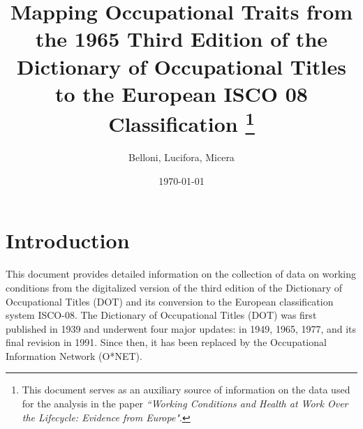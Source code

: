 \documentclass[11pt, a4paper, leqno]{article}
\title{Mapping Occupational Traits from the 1965 Third Edition of the Dictionary of Occupational Titles to the European ISCO 08 Classification \thanks{This document serves as an auxiliary source of information on the data used for the analysis in the paper \textit{``Working Conditions and Health at Work Over the Lifecycle: Evidence from Europe"}.}}
\author{Belloni, Lucifora, Micera}
\date{\today}
\begin{document}
\maketitle

\section{Introduction}
This document provides detailed information on the collection of data on working conditions from the digitalized version of the third edition of the Dictionary of Occupational Titles (DOT) and its conversion to the European classification system ISCO-08. 
The Dictionary of Occupational Titles (DOT) was first published in 1939 and underwent four major updates: in 1949, 1965, 1977, and its final revision in 1991. Since then, it has been replaced by the Occupational Information Network (O*NET). 






\newpage
\nocite{*}
\printbibliography
\end{document}
